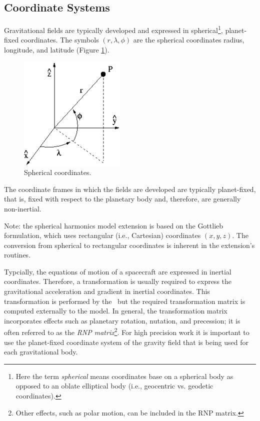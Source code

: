 \subsection{Coordinate Systems}\label{sec:coordinates}
Gravitational fields are typically developed and expressed 
in spherical\footnote{Here the term
{\it spherical} means coordinates base on a spherical body as opposed to an
oblate elliptical body (i.e., geocentric vs. geodetic coordinates).},
planet-fixed coordinates. The symbols $(r,\lambda,\phi)$ are the spherical
coordinates radius, longitude, and latitude (Figure \ref{fig:sphere_cord}).
\begin{figure}[h]
\centering
\includegraphics[width=2in]{figs/sphere.jpg}
\caption{Spherical coordinates.}
\label{fig:sphere_cord}
\end{figure}
The coordinate frames in which the fields are developed are typically
planet-fixed, that is, fixed with respect to the planetary body and,
therefore, are generally non-inertial.

Note: the spherical harmonics model extension is based on the
Gottlieb~\cite{JSC23762} formulation, which uses rectangular (i.e., Cartesian)
coordinates $(x,y,z)$.  The conversion from spherical to rectangular
coordinates is inherent in the extension's routines.

Typcially, the equations of motion of a spacecraft are expressed in 
inertial coordinates.  Therefore, a transformation is usually required
to express the gravitational acceleration and gradient in inertial coordinates.
This transformation is performed by the \ModelDesc\, but the required
transformation matrix is computed externally to the model.  In general,
the transformation matrix incorporates effects such as planetary rotation,
nutation, and precession; it is often referred to as the
{\it RNP matrix}\footnote{Other effects, such as polar motion, can be included
in the RNP matrix.}. For high precision work it is important to use the
planet-fixed coordinate system of the gravity field that is being used for each
gravitational body.

